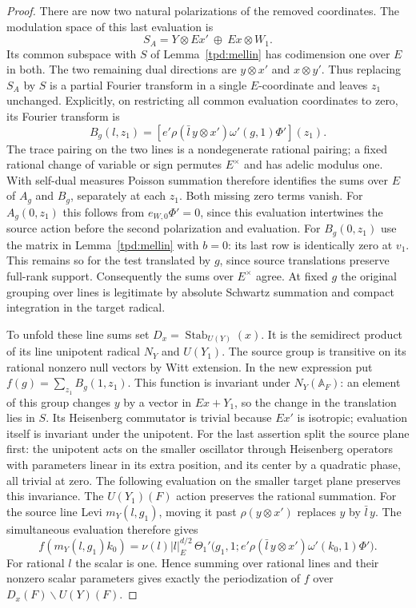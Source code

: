 \begin{proof}
There are now two natural polarizations of the removed coordinates.
The modulation space of this last evaluation is
\[
 S_A=Y\otimes Ex'\ \oplus\ Ex\otimes W_1 .
\]
Its common subspace with \(S\) of Lemma~\ref{tpd:mellin} has
codimension one over \(E\) in both. The two remaining dual directions
are \(y\otimes x'\) and \(x\otimes y'\). Thus replacing \(S_A\)
by \(S\) is a partial Fourier transform in a single \(E\)-coordinate
and leaves \(z_1\) unchanged. Explicitly, on restricting all common
evaluation coordinates to zero, its Fourier transform is
\[
 B_g(l,z_1)=[e'\rho(\bar l\,y\otimes x')\omega'(g,1)\Phi'](z_1).
\]
The trace pairing on the two lines is a nondegenerate rational
pairing; a fixed rational change of variable or sign permutes
\(E^\times\) and has adelic modulus one. With self-dual measures
Poisson summation therefore identifies the sums over \(E\) of
\(A_g\) and \(B_g\), separately at each \(z_1\).
Both missing zero terms vanish. For \(A_g(0,z_1)\) this follows
from \(e_{W,0}\Phi'=0\), since this evaluation intertwines the
source action before the second polarization and evaluation.
For \(B_g(0,z_1)\) use the
matrix in Lemma~\ref{tpd:mellin} with \(b=0\): its last row is
identically zero at \(v_1\). This remains so for the test translated
by \(g\), since source translations preserve full-rank support.
Consequently the sums over \(E^\times\) agree. At fixed \(g\)
the original grouping over lines is legitimate by absolute
Schwartz summation and compact integration in the target radical.

To unfold these line sums set \(D_x=\operatorname{Stab}_{U(Y)}(x)\).
It is the semidirect product of its line unipotent radical \(N_Y\)
and \(U(Y_1)\). The source group is transitive on its rational
nonzero null vectors by Witt extension. In the new expression put
\(f(g)=\sum_{z_1} B_g(1,z_1)\). This function is invariant under
\(N_Y(\mathbb A_F)\): an element of this group changes \(y\)
by a vector in \(Ex+Y_1\), so the change in the translation lies
in \(S\). Its Heisenberg commutator is trivial because \(Ex'\)
is isotropic; evaluation itself is invariant under the unipotent.
For the last assertion split the source plane first: the unipotent
acts on the smaller oscillator through Heisenberg operators with
parameters linear in its extra position, and its center by a
quadratic phase, all trivial at zero. The following evaluation on
the smaller target plane preserves this invariance.
The \(U(Y_1)(F)\) action preserves the rational summation.
For the source line Levi \(m_Y(l,g_1)\), moving it past
\(\rho(y\otimes x')\) replaces \(y\) by \(\bar l\,y\).
The simultaneous evaluation therefore gives
\[
 f(m_Y(l,g_1)k_0)=\nu(l)|l|_E^{d/2}\,
 \Theta_1'\bigl(g_1,1;
    e'\rho(\bar l\,y\otimes x')\omega'(k_0,1)\Phi'\bigr).
\]
For rational \(l\) the scalar is one. Hence summing over rational
lines and their nonzero scalar parameters gives exactly the
periodization of \(f\) over \(D_x(F)\backslash U(Y)(F)\).


\end{proof}
